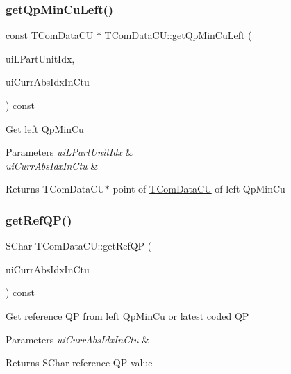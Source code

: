 \subsubsection{\texorpdfstring{get\+Qp\+Min\+Cu\+Left()}{getQpMinCuLeft()}}
{\footnotesize\ttfamily const \hyperlink{class_t_com_data_c_u}{T\+Com\+Data\+CU} $\ast$ T\+Com\+Data\+C\+U\+::get\+Qp\+Min\+Cu\+Left (\begin{DoxyParamCaption}\item[{U\+Int \&}]{ui\+L\+Part\+Unit\+Idx,  }\item[{U\+Int}]{ui\+Curr\+Abs\+Idx\+In\+Ctu }\end{DoxyParamCaption}) const}

Get left Qp\+Min\+Cu 
\begin{DoxyParams}{Parameters}
{\em ui\+L\+Part\+Unit\+Idx} & \\
\hline
{\em ui\+Curr\+Abs\+Idx\+In\+Ctu} & \\
\hline
\end{DoxyParams}
\begin{DoxyReturn}{Returns}
T\+Com\+Data\+C\+U$\ast$ point of \hyperlink{class_t_com_data_c_u}{T\+Com\+Data\+CU} of left Qp\+Min\+Cu 
\end{DoxyReturn}
\mbox{\label{class_t_com_data_c_u_a6106f12fbae81a13060b0587c5a5458f}} 
\subsubsection{\texorpdfstring{get\+Ref\+Q\+P()}{getRefQP()}}
{\footnotesize\ttfamily S\+Char T\+Com\+Data\+C\+U\+::get\+Ref\+QP (\begin{DoxyParamCaption}\item[{U\+Int}]{ui\+Curr\+Abs\+Idx\+In\+Ctu }\end{DoxyParamCaption}) const}

Get reference QP from left Qp\+Min\+Cu or latest coded QP 
\begin{DoxyParams}{Parameters}
{\em ui\+Curr\+Abs\+Idx\+In\+Ctu} & \\
\hline
\end{DoxyParams}
\begin{DoxyReturn}{Returns}
S\+Char reference QP value 
\end{DoxyReturn}
\mbox{\label{class_t_com_data_c_u_ad5fda1e6ae341e2bbe617a4a1743b72e}} 
